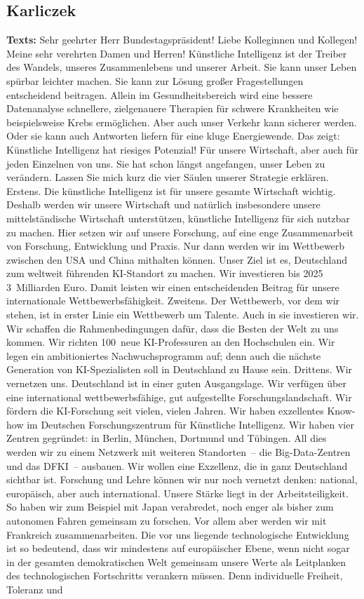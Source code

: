 \documentclass{article}
\begin{document}
\subsection{Karliczek}
\noindent\textbf{Texts:} Sehr geehrter Herr Bundestagspräsident! Liebe Kolleginnen und Kollegen! Meine sehr verehrten Damen und Herren! Künstliche Intelligenz ist der Treiber des Wandels, unseres Zusammenlebens und unserer Arbeit. Sie kann unser Leben spürbar leichter machen. Sie kann zur Lösung großer Fragestellungen entscheidend beitragen. Allein im Gesundheitsbereich wird eine bessere Datenanalyse schnellere, zielgenauere Therapien für schwere Krankheiten wie beispielsweise Krebs ermöglichen. Aber auch unser Verkehr kann sicherer werden. Oder sie kann auch Antworten liefern für eine kluge Energiewende. Das zeigt: Künstliche Intelligenz hat riesiges Potenzial! Für unsere Wirtschaft, aber auch für jeden Einzelnen von uns. Sie hat schon längst angefangen, unser Leben zu verändern. Lassen Sie mich kurz die vier Säulen unserer Strategie erklären. Erstens. Die künstliche Intelligenz ist für unsere gesamte Wirtschaft wichtig. Deshalb werden wir unsere Wirtschaft und natürlich insbesondere unsere mittelständische Wirtschaft unterstützen, künstliche Intelligenz für sich nutzbar zu machen. Hier setzen wir auf unsere Forschung, auf eine enge Zusammenarbeit von Forschung, Entwicklung und Praxis. Nur dann werden wir im Wettbewerb zwischen den USA und China mithalten können. Unser Ziel ist es, Deutschland zum weltweit führenden KI-Standort zu machen.  Wir investieren bis 2025  3 Milliarden Euro. Damit leisten wir einen entscheidenden Beitrag für unsere internationale Wettbewerbsfähigkeit. Zweitens. Der Wettbewerb, vor dem wir stehen, ist in erster Linie ein Wettbewerb um Talente. Auch in sie investieren wir. Wir schaffen die Rahmenbedingungen dafür, dass die Besten der Welt zu uns kommen. Wir richten 100 neue KI-Professuren an den Hochschulen ein. Wir legen ein ambitioniertes Nachwuchsprogramm auf; denn auch die nächste Generation von KI-Spezialisten soll in Deutschland zu Hause sein.  Drittens. Wir vernetzen uns. Deutschland ist in einer guten Ausgangslage. Wir verfügen über eine international wettbewerbsfähige, gut aufgestellte Forschungslandschaft. Wir fördern die KI-Forschung seit vielen, vielen Jahren. Wir haben exzellentes Know-how im Deutschen Forschungszentrum für Künstliche Intelligenz. Wir haben vier Zentren gegründet: in Berlin, München, Dortmund und Tübingen. All dies werden wir zu einem Netzwerk mit weiteren Standorten – die Big-Data-Zentren und das DFKI – ausbauen. Wir wollen eine Exzellenz, die in ganz Deutschland sichtbar ist. Forschung und Lehre können wir nur noch vernetzt denken: national, europäisch, aber auch international. Unsere Stärke liegt in der Arbeitsteiligkeit. So haben wir zum Beispiel mit Japan verabredet, noch enger als bisher zum autonomen Fahren gemeinsam zu forschen. Vor allem aber werden wir mit Frankreich zusammenarbeiten. Die vor uns liegende technologische Entwicklung ist so bedeutend, dass wir mindestens auf europäischer Ebene, wenn nicht sogar in der gesamten demokratischen Welt gemeinsam unsere Werte als Leitplanken des technologischen Fortschritts verankern müssen. Denn individuelle Freiheit, Toleranz und 
\end{document}
